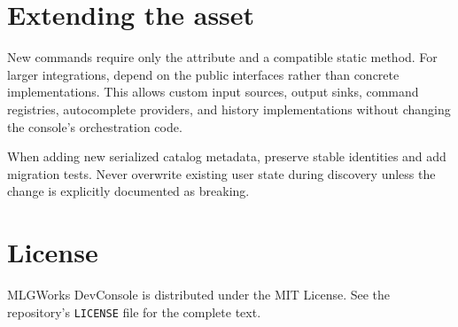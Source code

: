\documentclass[11pt,a4paper]{article}
\begin{document}
\section{Extending the asset}

New commands require only the attribute and a compatible static method. For larger integrations, depend on the public interfaces rather than concrete implementations. This allows custom input sources, output sinks, command registries, autocomplete providers, and history implementations without changing the console's orchestration code.

When adding new serialized catalog metadata, preserve stable identities and add migration tests. Never overwrite existing user state during discovery unless the change is explicitly documented as breaking.

\section{License}

MLGWorks DevConsole is distributed under the MIT License. See the repository's \texttt{LICENSE} file for the complete text.
\end{document}
